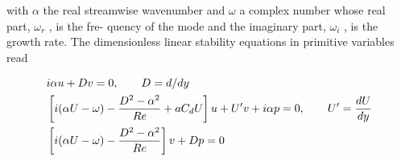 with $\alpha$ the real streamwise wavenumber and $\omega$ a complex number whose real part, $\omega_r$ , is the fre-
quency of the mode and the imaginary part, $\omega_i$ , is the growth rate. The dimensionless linear stability
equations in primitive variables read

\begin{equation}
\begin{split}
& i\alpha u + D v =0,  \qquad D=d/dy \vspace{0.3cm}\\
& \left [ i (\alpha U -\omega)   - \frac{D^2-\alpha^2}{Re}+ a C_d U \right] u + U' v + i \alpha p  = 0,  \qquad U'=\dfrac{d U}{dy} \vspace{0.3cm} \\
& \left[ i (\alpha U -\omega)   - \frac{D^2-\alpha^2}{Re} \right ] v + D p   = 0
\label{eq:uvp}
\end{split}
\end{equation}


